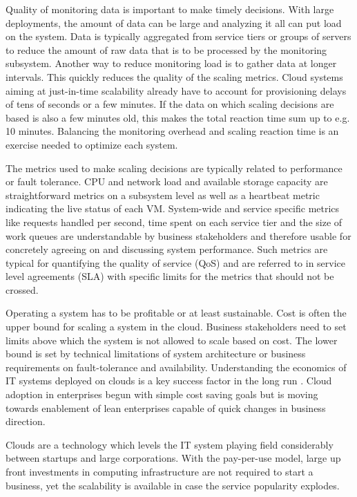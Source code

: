 \documentclass[english]{tktltiki2}
\theoremstyle{definition}
\theoremstyle{remark}
\begin{document}
Quality of monitoring data is important to make timely decisions. With large
deployments, the amount of data can be large and analyzing it all can put load
on the system. Data is typically aggregated from service tiers or groups of
servers to reduce the amount of raw data that is to be processed by the
monitoring subsystem. Another way to reduce monitoring load is to gather data at
longer intervals. This quickly reduces the quality of the scaling metrics. Cloud
systems aiming at just-in-time scalability already have to account for
provisioning delays of tens of seconds or a few minutes. If the data on which
scaling decisions are based is also a few minutes old, this makes the total
reaction time sum up to e.g. 10 minutes. Balancing the monitoring overhead and
scaling reaction time is an exercise needed to optimize each system.

The metrics used to make scaling decisions are typically related to performance
or fault tolerance. CPU and network load and available storage capacity are
straightforward metrics on a subsystem level as well as a heartbeat metric
indicating the live status of each VM. System-wide and service specific metrics
like requests handled per second, time spent on each service tier and the size
of work queues are understandable by business stakeholders and therefore usable
for concretely agreeing on and discussing system performance. Such metrics are
typical for quantifying the quality of service (QoS) and are referred to in
service level agreements (SLA) \cite{Boloor2011} with specific limits for the
metrics that should not be crossed.


Operating a system has to be profitable or at least sustainable. Cost is often
the upper bound for scaling a system in the cloud. Business stakeholders need to
set limits above which the system is not allowed to scale based on cost. The
lower bound is set by technical limitations of system architecture or business
requirements on fault-tolerance and availability. Understanding the economics of
IT systems deployed on clouds is a key success factor in the long run
\cite{Suleiman2011}. Cloud adoption in enterprises begun with simple cost saving
goals but is moving towards enablement of lean enterprises capable of quick
changes in business direction.

Clouds are a technology which levels the IT system playing field considerably
between startups and large corporations. With the pay-per-use model, large up
front investments in computing infrastructure are not required to start a
business, yet the scalability is available in case the service popularity
explodes.
\end{document}
